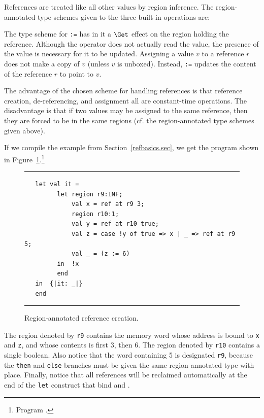 \documentclass[12pt]{book}
\begin{document}
References are treated like all other values by region inference.  The
region-annotated type schemes given to the three built-in operations
are: \medskip

\medskip

\noindent
The type scheme for \verb+:=+ has in it a $\Get$ effect on the region
holding the reference. Although the operator does not actually read
the value, the presence of the value is necessary for it to be updated.
Assigning a value $v$ to a reference $r$ does not make a copy of $v$
(unless $v$ is unboxed). Instead, \verb+:=+ updates the content of the reference $r$
to point to $v$.

The advantage of the chosen scheme for handling references is that
reference creation, de-referencing, and assignment all are
constant-time operations. The disadvantage is that if two values may
be assigned to the same reference, then they are forced to be in the
same regions (cf. the region-annotated type schemes given above).

If we compile the example from Section~\ref{refbasics.sec}, we get the
program shown in Figure~\ref{otherrefs.fig}.\footnote{Program
  .}
\begin{figure}
\hrule
\medskip
\begin{verbatim}
   let val it =
         let region r9:INF;
             val x = ref at r9 3;
             region r10:1;
             val y = ref at r10 true;
             val z = case !y of true => x | _ => ref at r9 5;
             val _ = (z := 6)
         in  !x
         end
   in  {|it: _|}
   end
\end{verbatim}
\caption{Region-annotated reference creation.}
\label{otherrefs.fig}
\medskip
\hrule
\end{figure}
The region denoted by {\tt r9} contains the memory word whose address
is bound to {\tt x} and {\tt z}, and whose contents is first 3, then
6.  The region denoted by {\tt r10} contains a single boolean.  Also
notice that the word containing 5 is designated {\tt r9}, because the
{\tt then} and {\tt else} branches must be given the same
region-annotated type with place. Finally, notice that all references
will be reclaimed automatically at the end of the {\tt let}
construct that bind  and .
\end{document}
